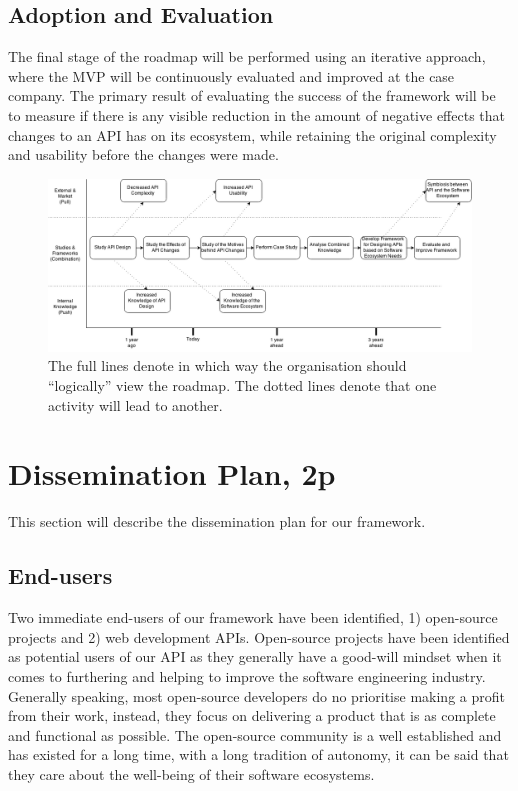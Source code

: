 \documentclass{article}
\begin{document}
\subsection{Adoption and Evaluation}
The final stage of the roadmap will be performed using an iterative approach, where the MVP will be continuously evaluated and improved at the case company. The primary result of evaluating the success of the framework will be to measure if there is any visible reduction in the amount of negative effects that changes to an API has on its ecosystem, while retaining the original complexity and usability before the changes were made.

\begin{figure}
\centering
\includegraphics[width=220mm]{RoadMap.png}
\caption{The full lines denote in which way the organisation should ``logically'' view the roadmap. The dotted lines denote that one activity will lead to another. }
\label{fig:roadmap}
\end{figure}

\section{Dissemination Plan, 2p}
This section will describe the dissemination plan for our framework. 

\subsection{End-users}

Two immediate end-users of our framework have been identified, 1) open-source projects and 2) web development APIs. Open-source projects have been identified as potential users of our API as they generally have a good-will mindset when it comes to furthering and helping to improve the software engineering industry. Generally speaking, most open-source developers do no prioritise making a profit from their work, instead, they focus on delivering a product that is as complete and functional as possible. The open-source community is a well established and has existed for a long time, with a long tradition of autonomy, it can be said that they care about the well-being of their software ecosystems. 
\end{document}
